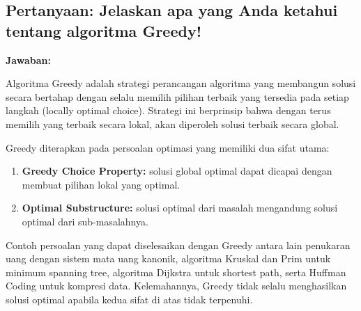 \subsection*{Pertanyaan: Jelaskan apa yang Anda ketahui tentang algoritma Greedy!}

\textbf{Jawaban:}

Algoritma Greedy adalah strategi perancangan algoritma yang membangun solusi secara bertahap dengan selalu memilih pilihan terbaik yang tersedia pada setiap langkah (locally optimal choice). Strategi ini berprinsip bahwa dengan terus memilih yang terbaik secara lokal, akan diperoleh solusi terbaik secara global.

Greedy diterapkan pada persoalan optimasi yang memiliki dua sifat utama:
\begin{enumerate}
    \item \textbf{Greedy Choice Property:} solusi global optimal dapat dicapai dengan membuat pilihan lokal yang optimal.
    \item \textbf{Optimal Substructure:} solusi optimal dari masalah mengandung solusi optimal dari sub-masalahnya.
\end{enumerate}

Contoh persoalan yang dapat diselesaikan dengan Greedy antara lain penukaran uang dengan sistem mata uang kanonik, algoritma Kruskal dan Prim untuk minimum spanning tree, algoritma Dijkstra untuk shortest path, serta Huffman Coding untuk kompresi data. Kelemahannya, Greedy tidak selalu menghasilkan solusi optimal apabila kedua sifat di atas tidak terpenuhi.